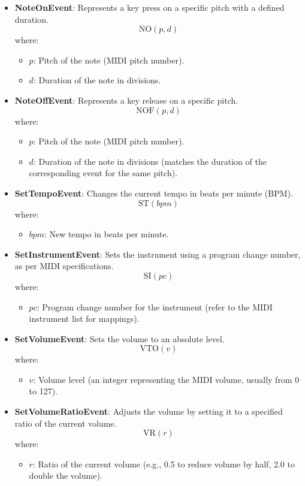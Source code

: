 \documentclass[letterpaper,12pt]{article}
\begin{document}
\begin{itemize}
    \item \textbf{NoteOnEvent}: Represents a key press on a specific pitch with a defined duration.
    \[
    \text{NO}(p, d)
    \]
    where:
    \begin{itemize}
        \item \( p \): Pitch of the note (MIDI pitch number).
        \item \( d \): Duration of the note in divisions.
    \end{itemize}

    \item \textbf{NoteOffEvent}: Represents a key release on a specific pitch.
    \[
    \text{NOF}(p, d)
    \]
    where:
    \begin{itemize}
        \item \( p \): Pitch of the note (MIDI pitch number).
        \item \( d \): Duration of the note in divisions (matches the duration of the corresponding  event for the same pitch).
    \end{itemize}

    \item \textbf{SetTempoEvent}: Changes the current tempo in beats per minute (BPM).
    \[
    \text{ST}(bpm)
    \]
    where:
    \begin{itemize}
        \item \( bpm \): New tempo in beats per minute.
    \end{itemize}

    \item \textbf{SetInstrumentEvent}: Sets the instrument using a program change number, as per MIDI specifications.
    \[
    \text{SI}(pc)
    \]
    where:
    \begin{itemize}
        \item \( pc \): Program change number for the instrument (refer to the MIDI instrument list for mappings).
    \end{itemize}

    \item \textbf{SetVolumeEvent}: Sets the volume to an absolute level.
    \[
    \text{VTO}(v)
    \]
    where:
    \begin{itemize}
        \item \( v \): Volume level (an integer representing the MIDI volume, usually from 0 to 127).
    \end{itemize}

    \item \textbf{SetVolumeRatioEvent}: Adjusts the volume by setting it to a specified ratio of the current volume.
    \[
    \text{VR}(r)
    \]
    where:
    \begin{itemize}
        \item \( r \): Ratio of the current volume (e.g., 0.5 to reduce volume by half, 2.0 to double the volume).
    \end{itemize}
\end{itemize}
\end{document}
